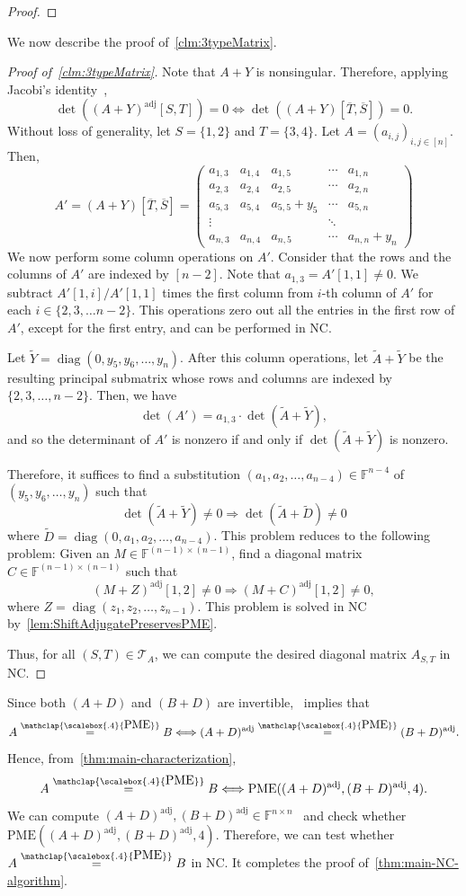 \documentclass[11pt,letterpaper]{article}
\DeclareMathOperator*{\diag}{diag}
\newcommand{\comp}[1]{\overline{#1}}
\newcommand{\F}{\mathbb{F}}
\DeclareMathOperator{\ad}{adj}
\newcommand{\adj}[1]{(#1)^{\ad}}
\newcommand{\PME}{\stackrel{\mathclap{\scalebox{.4}{\mbox{PME}}}}{=}}
\newcommand{\kPME}[3]{\mathrm{PME}(#1, #2, #3)}
\begin{document}
{{{\begin{proof}
\end{proof}
We now describe the proof of~\cref{clm:3typeMatrix}.
\begin{proof}[Proof of~\cref{clm:3typeMatrix}]
Note that $A+Y$ is nonsingular. Therefore, applying Jacobi's identity~\cite[Page~21]{Gantmacher59}, $$\det\left(\adj{A+Y}[S,T]\right)=0 \Longleftrightarrow \det\left((A+Y)[\comp{T},\comp{S}]\right)=0.$$ Without loss of generality, let $S=\{1,2\}$ and $T=\{3,4\}$. Let $A=(a_{i,j})_{i,j\in[n]}$. Then,
\[
A'=(A+Y)[\comp{T},\comp{S}]= 
\begin{pmatrix} a_{1,3} & a_{1,4} & a_{1,5} & \cdots & a_{1,n}\\
a_{2,3} & a_{2,4} & a_{2,5} & \cdots & a_{2,n}\\
a_{5,3} & a_{5,4} & a_{5,5}+y_5 & \cdots & a_{5,n}\\
    \vdots & & & \ddots &\\
a_{n,3} & a_{n,4} & a_{n,5} & \cdots & a_{n,n}+y_n 
\end{pmatrix}
\]
We now perform some column operations on $A'$. Consider that the rows and the columns of $A'$ are indexed by $[n-2]$. Note that $a_{1, 3}=A'[1, 1]\neq 0$. We subtract $A'[1,i]/A'[1,1]$ times the first column from $i$-th column of $A'$ for each $i\in \{2,3,\dots n-2\}$. This operations zero out all the entries in the first row of $A'$, except for the first entry, and can be  performed in NC. 

Let $\widetilde Y=\diag (0, y_5, y_6,\ldots, y_n)$. After this column operations, let $\tilde A+\widetilde Y$ be the resulting principal submatrix whose rows and columns are indexed by $\{2,3,\dots,n-2\}$. Then, we have $$\det(A')=a_{1,3}\cdot \det(\tilde A+\widetilde Y),$$ and so the determinant of $A'$ is nonzero if and only if $\det(\tilde A+\widetilde Y)$ is nonzero. 

Therefore, it suffices to find a substitution $(a_1, a_2, \ldots, a_{n-4})\in\F^{n-4}$ of $(y_5, y_6, \ldots, y_n)$ such that $$\det\left(\tilde A+\widetilde Y\right)\neq 0\Longrightarrow \det\left(\tilde A+\widetilde D\right)\neq 0$$ where  $\widetilde D=\diag(0,a_1, a_2, \ldots, a_{n-4})$. This problem reduces to the following problem: Given an $M\in\F^{(n-1)\times (n-1)}$, find a diagonal matrix $C\in\F^{(n-1)\times (n-1)}$ such that $$\adj{M+Z}[1,2 ]\neq 0\Longrightarrow \adj{M+C}[1,2]\neq 0,$$ where $Z=\diag(z_1, z_2, \ldots, z_{n-1})$. This problem is solved in NC by~\cref{lem:ShiftAdjugatePreservesPME}. 

Thus, for all $(S, T)\in\mathcal T_A$, we can compute the desired diagonal matrix $A_{S, T}$ in NC.  
\end{proof}
Since both $(A+D)$ and $(B+D)$ are invertible,~\cite[Lemma~2.9]{Chatterjee25} implies that $$A\PME B\Longleftrightarrow \adj{A+D}\PME\adj{B+D}.$$ Hence, from~\cref{thm:main-characterization}, 
$$A\PME B \Longleftrightarrow \kPME{\adj{A+D}}{\adj{B+D}}{4}.$$
We can compute $\adj{A+D},\adj{B+D}\in \mathbb{F}^{n\times n}$~\cite{Csanky76, Borodin83} and check whether $\kPME{\adj{A+D}}{\adj{B+D}}{4}$. Therefore, we can test whether $A\PME B$ in NC. It completes the proof of~\cref{thm:main-NC-algorithm}.

}}}
\end{document}
